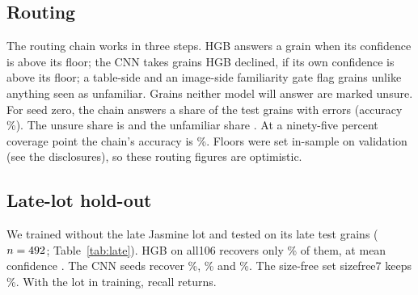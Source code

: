\documentclass[conference,a4paper]{IEEEtran}
\begin{document}
\subsection{Routing}
The routing chain works in three steps. HGB answers a grain when its confidence is above its floor; the CNN takes grains HGB declined, if its own confidence is above its floor; a table-side and an image-side familiarity gate flag grains unlike anything seen as unfamiliar. Grains neither model will answer are marked unsure. For seed zero, the chain answers a share \RouteSeedZeroAnsweredTotalShare{} of the \TestN{} test grains with \RouteSeedZeroAnsweredTotalErrors{} errors (accuracy \RouteSeedZeroAnsweredTotalAccPct\%). The unsure share is \RouteSeedZeroUnsureShare{} and the unfamiliar share \RouteSeedZeroUnfamiliarShare. At a ninety-five percent coverage point the chain's accuracy is \RouteSeedZeroChainErrAtNineFiveCoverageAccPct\%. Floors were set in-sample on validation (see the disclosures), so these routing figures are optimistic.

\subsection{Late-lot hold-out}\label{sec:late}
We trained without the late Jasmine lot and tested on its late test grains ($n=492$; Table~\ref{tab:late}). HGB on all106 recovers only \LateHoldoutHgbAllOneZeroSixLateTestRecallPct\% of them, at mean confidence \LateHoldoutHgbAllOneZeroSixLateTestMeanConf. The CNN seeds recover \LateHoldoutCnnSeedZeroLateTestRecallPct\%, \LateHoldoutCnnSeedOneLateTestRecallPct\% and \LateHoldoutCnnSeedTwoLateTestRecallPct\%. The size-free set sizefree7 keeps \LateHoldoutHgbSizefreeSevenLateTestRecallPct\%. With the lot in training, recall returns.
\end{document}
